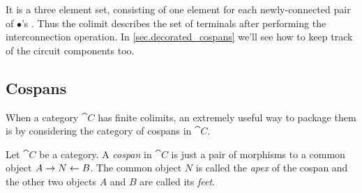 \documentclass[7Sketches]{subfiles}
\begin{document}
\begin{example}
It is a three element set, consisting of one element for each newly-connected
pair of $\bullet$'s . Thus the colimit describes the set of terminals after
performing the interconnection operation. In \cref{sec.decorated_cospans} we'll
see how to keep track of the circuit components too.%
\end{example}

%
%

\subsection{Cospans}%
\label{subsec.cospans}
When a category $\cat{C}$ has finite colimits, an extremely useful way to package them is by considering the category of cospans in $\cat{C}$.%

\begin{definition}%
Let $\cat{C}$ be a category. A \emph{cospan} in $\cat{C}$ is just a pair of morphisms to a common object $A\to N\leftarrow B$. The common object $N$ is called the \emph{apex} of the cospan and the other two objects $A$ and $B$ are called its \emph{feet}.%
%
\end{definition}
\end{document}
